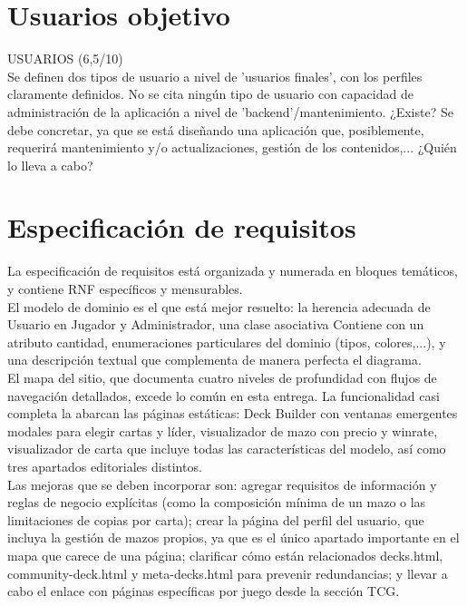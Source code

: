 \documentclass[10pt]{article}
\begin{document}
	\section{Usuarios objetivo}
		USUARIOS (6,5/10)\\
		Se definen dos tipos de usuario a nivel de 'usuarios finales', con los perfiles claramente definidos. No se cita ningún tipo de usuario con capacidad de administración de la aplicación a nivel de 'backend'/mantenimiento. ¿Existe? Se debe concretar, ya que se está diseñando una aplicación que, posiblemente, requerirá mantenimiento y/o actualizaciones, gestión de los contenidos,... ¿Quién lo lleva a cabo?\\
	
	\section{Especificación de requisitos}
		La especificación de requisitos está organizada y numerada en bloques temáticos, y contiene RNF específicos y mensurables.\\
		
		El modelo de dominio es el que está mejor resuelto: la herencia adecuada de Usuario en Jugador y Administrador, una clase asociativa Contiene con un atributo cantidad, enumeraciones particulares del dominio (tipos, colores,...), y una descripción textual que complementa de manera perfecta el diagrama.\\
		
		El mapa del sitio, que documenta cuatro niveles de profundidad con flujos de navegación detallados, excede lo común en esta entrega. La funcionalidad casi completa la abarcan las páginas estáticas: Deck Builder con ventanas emergentes modales para elegir cartas y líder, visualizador de mazo con precio y winrate, visualizador de carta que incluye todas las características del modelo, así como tres apartados editoriales distintos.\\
		
		Las mejoras que se deben incorporar son: agregar requisitos de información y reglas de negocio explícitas (como la composición mínima de un mazo o las limitaciones de copias por carta); crear la página del perfil del usuario, que incluya la gestión de mazos propios, ya que es el único apartado importante en el mapa que carece de una página; clarificar cómo están relacionados decks.html, community-deck.html y meta-decks.html para prevenir redundancias; y llevar a cabo el enlace con páginas específicas por juego desde la sección TCG.\\
		
\end{document}
